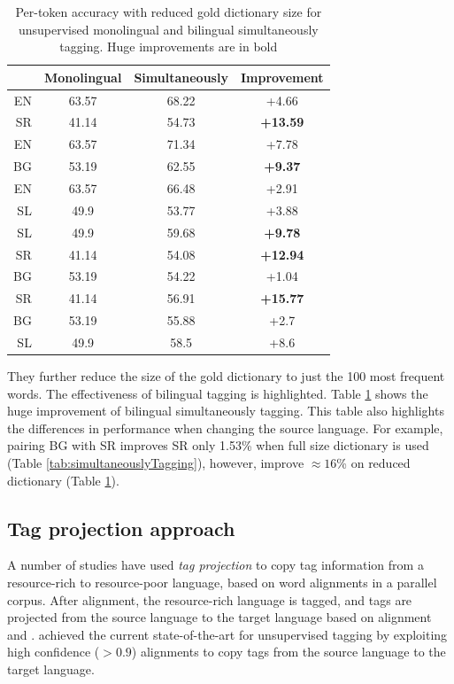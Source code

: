 \begin{table}
  \centering
    \begin{tabular}{r|ccc}

          & \textbf{Monolingual} & \textbf{Simultaneously} & \textbf{Improvement} \\
	\hline
    EN    & 63.57 & 68.22 & +4.66 \\
    SR    & 41.14 & 54.73 & \textbf{+13.59} \\
    	\hline
    EN    & 63.57 & 71.34 & +7.78 \\
    BG    & 53.19 & 62.55 & \textbf{+9.37} \\
    	\hline
    EN    & 63.57 & 66.48 & +2.91 \\
    SL    & 49.9  & 53.77 & +3.88 \\
    	\hline
    SL    & 49.9  & 59.68 & \textbf{+9.78} \\
    SR    & 41.14 & 54.08 & \textbf{+12.94} \\
    	\hline
    BG    & 53.19 & 54.22 & +1.04 \\
    SR    & 41.14 & 56.91 & \textbf{+15.77} \\
    	\hline
    BG    & 53.19 & 55.88 & +2.7 \\
    SL    & 49.9  & 58.5  & +8.6 \\

    \end{tabular}
  \caption{Per-token accuracy with reduced gold dictionary size for unsupervised monolingual and bilingual simultaneously tagging. Huge improvements are in bold}    
  \label{tab:simultaneouslyTaggingReducedDic}%
\end{table}%

They further reduce the size of the gold dictionary to just the 100 most frequent words. The effectiveness of bilingual tagging is highlighted. Table \ref{tab:simultaneouslyTaggingReducedDic} shows the huge improvement of bilingual simultaneously tagging. This table also highlights the differences in performance when changing the source language. For example, pairing BG with SR improves SR only 1.53\% when full size dictionary is used (Table \ref{tab:simultaneouslyTagging}), however, improve $\approx 16$\% on reduced dictionary (Table \ref{tab:simultaneouslyTaggingReducedDic}). 

\subsection{Tag projection approach}
A number of studies have used \emph{tag projection} to copy tag
information from a resource-rich to resource-poor language, based on
word alignments in a parallel corpus. After alignment, the
resource-rich language is tagged, and tags are projected from the
source language to the target language based on alignment
\cite{YarowskyAndNgai} and \cite{Das:2011}.   achieved
the current state-of-the-art for unsupervised tagging by exploiting
high confidence ($>0.9$) alignments to copy tags from the source language to
the target language.  

